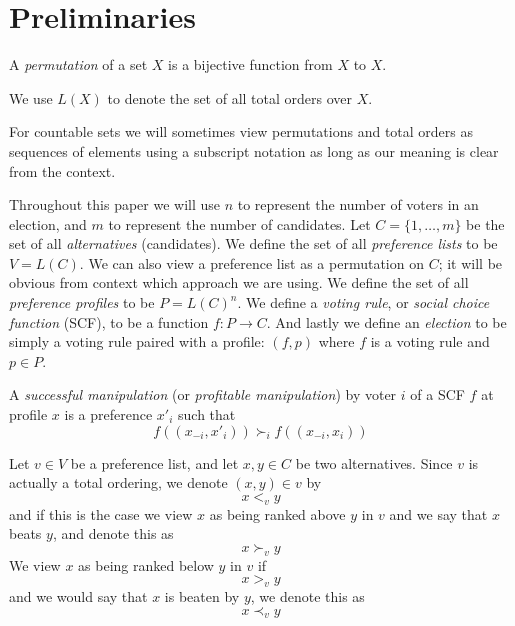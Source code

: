 
\chapter{Preliminaries}

	\begin{definition}
		A \emph{permutation} of a set $X$ is a bijective function from $X$ to $X$.
	\end{definition}

	\begin{definition}
		We use $L(X)$ to denote the set of all total orders over $X$.
	\end{definition}

	For countable sets we will sometimes view permutations and total orders as sequences of elements using a subscript notation as long as our meaning is clear from the context.

	\begin{definition}
		Throughout this paper we will use $n$ to represent the number of voters in an election, and $m$ to represent the number of candidates. Let $C = \{1, \ldots, m\}$ be the set of all \emph{alternatives} (candidates). We define the set of all \emph{preference lists} to be $V = L(C)$. We can also view a preference list as a permutation on $C$; it will be obvious from context which approach we are using. We define the set of all \emph{preference profiles} to be $P = L(C)^n$. We define a \emph{voting rule}, or \emph{social choice function} (SCF), to be a function $f : P \to C$. And lastly we define an \emph{election} to be simply a voting rule paired with a profile: $(f, p)$ where $f$ is a voting rule and $p \in P$.
	\end{definition}

	\begin{definition}
		A \emph{successful manipulation} (or \emph{profitable manipulation}) by voter $i$ of a SCF $f$ at profile $x$ is a preference $x'_i$ such that
		\[
			f((x_{-i}, x'_i)) \succ_i f((x_{-i}, x_i))
		\]
	\end{definition}

	\begin{definition}
		Let $v \in V$ be a preference list, and let $x, y \in C$ be two alternatives. Since $v$ is actually a total ordering, we denote $(x, y) \in v$ by
		\[
			x <_v y
		\]
		and if this is the case we view $x$ as being ranked above $y$ in $v$ and we say that $x$ beats $y$, and denote this as
		\[
			x \succ_v y
		\]
		We view $x$ as being ranked below $y$ in $v$ if
		\[
			x >_v y
		\]
		and we would say that $x$ is beaten by $y$, we denote this as
		\[
			x \prec_v y
		\]
	\end{definition}

